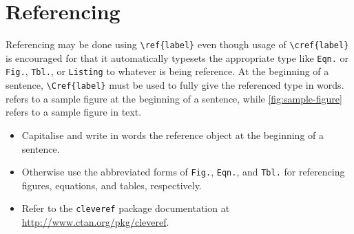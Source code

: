 \section{Referencing}\label{sec:referencing}

Referencing may be done using \lstinline!\ref{label}! even though usage of \lstinline!\cref{label}! is encouraged for that it automatically typesets the appropriate type like \texttt{Eqn.} or \texttt{Fig.}, \texttt{Tbl.}, or \texttt{Listing} to whatever is being reference. At the beginning of a sentence, \lstinline!\Cref{label}! must be used to fully give the referenced type in words.  refers to a sample figure at the beginning of a sentence, while \cref{fig:sample-figure} refers to a sample figure in text.

\begin{itemize}
    \item Capitalise and write in words the reference object at the beginning of a sentence.
    \item Otherwise use the abbreviated forms of \texttt{Fig.}, \texttt{Eqn.}, and \texttt{Tbl.} for referencing figures, equations, and tables, respectively.
    \item Refer to the \lstinline!cleveref! package documentation at \\\url{http://www.ctan.org/pkg/cleveref}.
\end{itemize}
